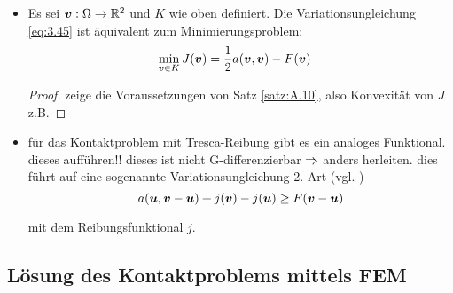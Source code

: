 \begin{itemize}
\begin{theorem}
\end{theorem}

\begin{proof}

\end{proof}

\item 
\begin{theorem}
Es sei $\boldsymbol v : \Omega \rightarrow \mathbb{R}^2$ und $K$ wie oben definiert. Die Variationsungleichung \eqref{eq:3.45} ist äquivalent zum Minimierungsproblem:
\begin{align}
	\min_{\boldsymbol v \in K} J(\boldsymbol v)& = \frac 1 2 a(\boldsymbol v, \boldsymbol v)-F(\boldsymbol v)
\end{align}
\end{theorem}

\begin{proof}
zeige die Voraussetzungen von Satz \ref{satz:A.10}, also Konvexität von $J$ z.B.
\end{proof}

\item 
\begin{bem}
für das Kontaktproblem mit Tresca-Reibung gibt es ein analoges Funktional. dieses aufführen!! dieses ist nicht G-differenzierbar $\Rightarrow$ anders herleiten. dies führt auf eine sogenannte  Variationsungleichung 2. Art (vgl. \cite{EPSContact})
\[
	a(\boldsymbol u, \boldsymbol v-\boldsymbol u) + j(\boldsymbol v) -  j(\boldsymbol u) \ge F(\boldsymbol v-\boldsymbol u)
\]
\end{bem}
mit dem Reibungsfunktional $j$.
\end{itemize}






\subsection{Lösung des Kontaktproblems mittels FEM}
\label{kap:3.2.3}


